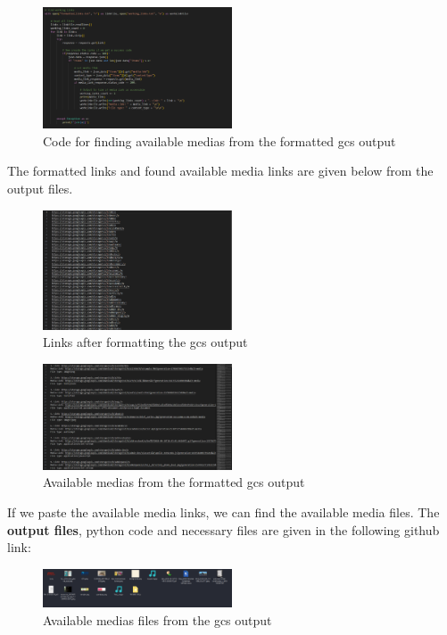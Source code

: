\documentclass[12 pt]{article}
\begin{document}
\begin{figure}[!htbp]
    \centering
    \includegraphics[width=0.5\textwidth]{gcs_Success_Links_Finding_Code.png}
    \caption{Code for finding available medias from the formatted gcs output}
    \label{fig: gcs Success Links Finding Code}
\end{figure}
The formatted links and found available media links are given below from the output files.
\begin{figure}[!htbp]
    \centering
    \includegraphics[width=0.5\textwidth]{gcs_Output_Formatted_Links.png}
    \caption{Links after formatting the gcs output}
    \label{fig: gcs Output Formatted Links}
\end{figure}

\begin{figure}[!htbp]
    \centering
    \includegraphics[width=0.5\textwidth]{gcs_Success_Links.png}
    \caption{Available medias from the formatted gcs output}
    \label{fig: gcs Success Links}
\end{figure}
If we paste the available media links, we can find the available media files. The \textbf{output files}, python code and necessary files are given in the following github link: \cite{github_output}
\begin{figure}[!htbp]
    \centering
    \includegraphics[width=0.5\textwidth]{gcs_Output_Files.png}
    \caption{Available medias files from the gcs output}
    \label{fig: gcs Output Files}
\end{figure}
\end{document}
